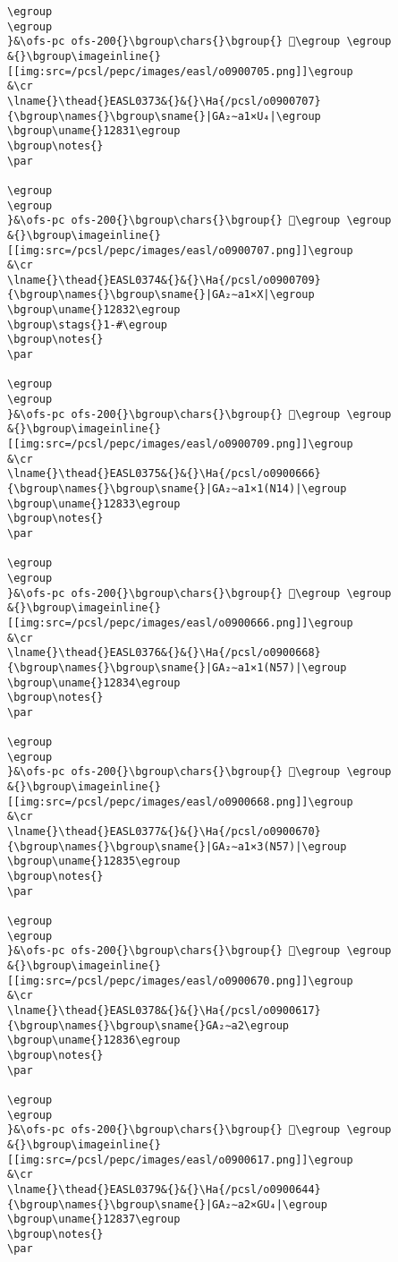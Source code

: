 \begin{verbatim}
\egroup
\egroup
}&\ofs-pc ofs-200{}\bgroup\chars{}\bgroup{} 𒠰\egroup \egroup
&{}\bgroup\imageinline{}[[img:src=/pcsl/pepc/images/easl/o0900705.png]]\egroup
&\cr
\lname{}\thead{}EASL0373&{}&{}\Ha{/pcsl/o0900707}{\bgroup\names{}\bgroup\sname{}|GA₂∼a1×U₄|\egroup
\bgroup\uname{}12831\egroup
\bgroup\notes{}
\par 

\egroup
\egroup
}&\ofs-pc ofs-200{}\bgroup\chars{}\bgroup{} 𒠱\egroup \egroup
&{}\bgroup\imageinline{}[[img:src=/pcsl/pepc/images/easl/o0900707.png]]\egroup
&\cr
\lname{}\thead{}EASL0374&{}&{}\Ha{/pcsl/o0900709}{\bgroup\names{}\bgroup\sname{}|GA₂∼a1×X|\egroup
\bgroup\uname{}12832\egroup
\bgroup\stags{}1-#\egroup
\bgroup\notes{}
\par 

\egroup
\egroup
}&\ofs-pc ofs-200{}\bgroup\chars{}\bgroup{} 𒠲\egroup \egroup
&{}\bgroup\imageinline{}[[img:src=/pcsl/pepc/images/easl/o0900709.png]]\egroup
&\cr
\lname{}\thead{}EASL0375&{}&{}\Ha{/pcsl/o0900666}{\bgroup\names{}\bgroup\sname{}|GA₂∼a1×1(N14)|\egroup
\bgroup\uname{}12833\egroup
\bgroup\notes{}
\par 

\egroup
\egroup
}&\ofs-pc ofs-200{}\bgroup\chars{}\bgroup{} 𒠳\egroup \egroup
&{}\bgroup\imageinline{}[[img:src=/pcsl/pepc/images/easl/o0900666.png]]\egroup
&\cr
\lname{}\thead{}EASL0376&{}&{}\Ha{/pcsl/o0900668}{\bgroup\names{}\bgroup\sname{}|GA₂∼a1×1(N57)|\egroup
\bgroup\uname{}12834\egroup
\bgroup\notes{}
\par 

\egroup
\egroup
}&\ofs-pc ofs-200{}\bgroup\chars{}\bgroup{} 𒠴\egroup \egroup
&{}\bgroup\imageinline{}[[img:src=/pcsl/pepc/images/easl/o0900668.png]]\egroup
&\cr
\lname{}\thead{}EASL0377&{}&{}\Ha{/pcsl/o0900670}{\bgroup\names{}\bgroup\sname{}|GA₂∼a1×3(N57)|\egroup
\bgroup\uname{}12835\egroup
\bgroup\notes{}
\par 

\egroup
\egroup
}&\ofs-pc ofs-200{}\bgroup\chars{}\bgroup{} 𒠵\egroup \egroup
&{}\bgroup\imageinline{}[[img:src=/pcsl/pepc/images/easl/o0900670.png]]\egroup
&\cr
\lname{}\thead{}EASL0378&{}&{}\Ha{/pcsl/o0900617}{\bgroup\names{}\bgroup\sname{}GA₂∼a2\egroup
\bgroup\uname{}12836\egroup
\bgroup\notes{}
\par 

\egroup
\egroup
}&\ofs-pc ofs-200{}\bgroup\chars{}\bgroup{} 𒠶\egroup \egroup
&{}\bgroup\imageinline{}[[img:src=/pcsl/pepc/images/easl/o0900617.png]]\egroup
&\cr
\lname{}\thead{}EASL0379&{}&{}\Ha{/pcsl/o0900644}{\bgroup\names{}\bgroup\sname{}|GA₂∼a2×GU₄|\egroup
\bgroup\uname{}12837\egroup
\bgroup\notes{}
\par 


\end{verbatim}
